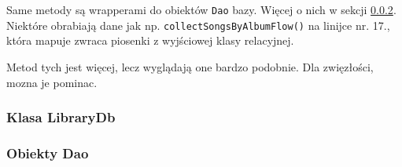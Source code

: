 Same metody są wrapperami do obiektów \texttt{Dao} bazy. Więcej o nich w sekcji \ref{sec:daos}. Niektóre obrabiają dane jak np. \texttt{collectSongsByAlbumFlow()} na linijce nr. 17., która mapuje zwraca piosenki z wyjściowej klasy relacyjnej.

Metod tych jest więcej, lecz wyglądają one bardzo podobnie. Dla zwięzłości, mozna je pominac.


\subsubsection{Klasa LibraryDb} \label{sec:LibraryDb}

\subsubsection{Obiekty Dao} \label{sec:daos}

